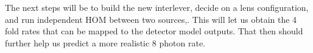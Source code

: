 \documentclass[aps,floatfix,superscriptaddress,onecolumn,tightenlines,amsmath,amssymb,nofootinbib,raggedbottom,nobalancelastpage,10pt]{revtex4-2}
\begin{document}
\vspace{1em}

The next steps will be to build the new interlever, decide on a lens configuration, and run independent HOM between two sources,. This will let us obtain the 4 fold rates that can be mapped to the detector model outputs. That then should further help us predict a more realistic 8 photon rate.
\end{document}
